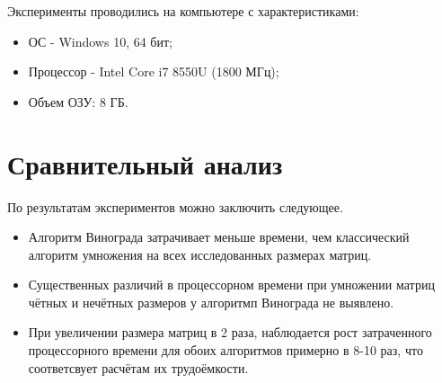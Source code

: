 Эксперименты проводились на компьютере с характеристиками:
\begin{itemize}
	\item ОС - Windows 10, 64 бит;
	\item Процессор -  Intel Core i7 8550U (1800 МГц);
	\item Объем ОЗУ: 8 ГБ.
\end{itemize}

\section{Сравнительный анализ}
По результатам экспериментов можно заключить следующее.
\begin{itemize}
	\item Алгоритм Винограда затрачивает меньше времени, чем классический алгоритм умножения на всех исследованных размерах матриц.
	\item Существенных различий в процессорном времени при умножении матриц чётных и нечётных размеров у алгоритмп Винограда не выявлено.
	\item При увеличении размера матриц в 2 раза, наблюдается рост затраченного процессорного времени для обоих алгоритмов примерно в 8-10 раз, что соответсвует расчётам их трудоёмкости.
\end{itemize}


	